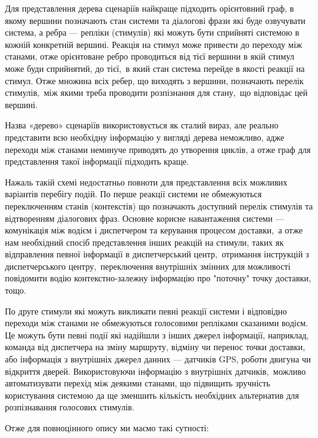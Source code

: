 Для представлення дерева сценаріїв найкраще підходить орієнтовний граф, в якому вершини позначають стан системи та діалогові фрази які буде озвучувати система, а ребра --- репліки (стимулів) які можуть бути сприйняті системою в кожній конкретній вершині. Реакція на стимул може привести до переходу між станами, отже орієнтоване ребро проводиться від тієї вершини в якій стимул може буди сприйнятий, до тієї, в який стан система перейде в якості реакції на стимул. Отже множина всіх ребер, що виходять з вершини, позначають перелік стимулів, між якими треба проводити розпізнання для стану, що відповідає цей вершині.

Назва «дерево» сценаріїв використовується як сталий вираз, але реально представити всю необхідну інформацію у вигляді дерева неможливо, адже переходи між станами неминуче приводять до утворення циклів, а отже граф для представлення такої інформації підходить краще.

Нажаль такій схемі недостатньо повноти для представлення всіх можливих варіантів перебігу подій. По перше реакції системи не обмежуються переключенням станів (контекстів) що позначають доступний перелік стимулів та відтворенням діалогових фраз. Основне корисне навантаження системи --- комунікація між водієм і диспетчером та керування процесом доставки, а отже нам необхідний спосіб представлення інших реакцій на стимули, таких як відправлення певної інформації в диспетчерський центр, отримання інструкцій з диспетчерського центру, переключення внутрішніх змінних для можливості повідомити водію контекстно-залежну інформацію про "поточну" точку доставки, тощо.

По друге стимули які можуть викликати певні реакції системи і відповідно переходи між станами не обмежуються голосовими репліками сказаними водієм. Це можуть бути певні події які надійшли з інших джерел інформації, наприклад, команда від диспетчера на зміну маршруту, відміну чи перенос точки доставки, або інформація з внутрішніх джерел данних --- датчиків GPS, роботи двигуна чи відкриття дверей. Використовуючи інформацію з внутрішніх датчиків, можливо автоматизувати перехід між деякими станами, що підвищить зручність користування системою да ще зменшить кількість необхідних альтернатив для розпізнавання голосових стимулів. 

Отже для повноцінного опису ми маємо такі сутності:

